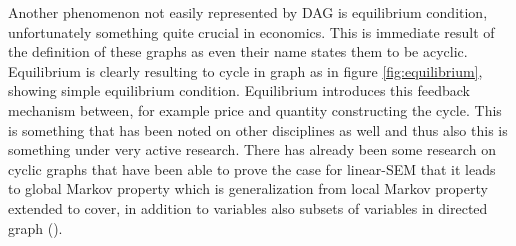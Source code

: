 \documentclass[main=english,12pt,a4paper,pdftex,econ,utf8]{aaltothesis}
\begin{document}
\begin{comment}
Economic theory being the factor that is in a way differing it from other kind of more general statistics inclined towards social phenomenons and the framework through which it is possible to even study the causal structures as those need the substantive knowledge of topic to have even possibility to be interpreted as CI at all. 
\end{comment}



Another phenomenon not easily represented by DAG is equilibrium condition, unfortunately something quite crucial in economics. This is immediate result of the definition of these graphs as even their name states them to be acyclic. Equilibrium is clearly resulting to cycle in graph as in figure \ref{fig:equilibrium}, showing simple equilibrium condition. Equilibrium introduces this feedback mechanism between, for example price and quantity constructing the cycle. This is something that has been noted on other disciplines as well and thus also this is something under very active research. There has already been some research on cyclic graphs that have been able to prove the case for linear-SEM that it leads to global Markov property which is generalization from local Markov property extended to cover, in addition to variables also subsets of variables in directed graph (\cite{PeterSpirtes1994}).
\end{document}
